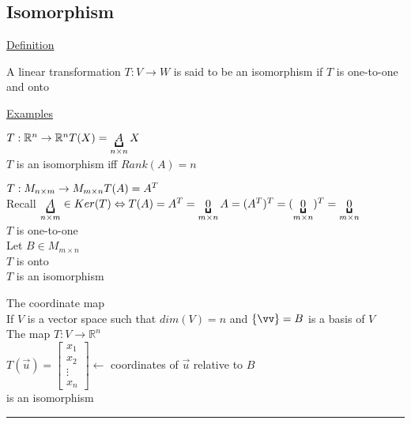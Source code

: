 \documentclass[12pt]{article}
\renewcommand{\v}[1]{\overrightarrow{#1}}
\newcommand\m[1]{\begin{bmatrix}#1\end{bmatrix}}
\newcommand{\real}[0]{\mathbb{R}}
\newenvironment{block}[1][Label]{\underline{#1}\par}{}
\newcommand{\uu}[1]{\underbracket{#1}}
\newenvironment{examples}{\shownto{-,compact}\underline{Examples}\enumerate}{\endenumerate\divider\endshownto}
\newcommand{\bb}[1]{\left\{#1\right\}}
\newcommand{\divider}[0]{\textcolor{lightgray}{\rule{\textwidth}{0.1pt}}}
\begin{document}
\subsection{Isomorphism}

\begin{block}[Definition]
	A linear transformation $T: V \rightarrow W$ is said to be an isomorphism if $T$ is one-to-one and onto
\end{block}

\begin{examples}
	\item $T: \real^n \rightarrow \real^n \\
	T(X) = \uu{A}_{n \times n} X$ \\
	$T$ is an isomorphism iff $Rank(A) = n$
	\item $T: M_{n \times m} \rightarrow M_{m \times n} \\
	T(A) = A^T$ \\
	Recall $\uu{A}_{n \times m} \in Ker(T) \Leftrightarrow T(A) = A^T = \uu{0}_{m \times n} \\
	A = (A^T)^T = (\uu{0}_{m \times n})^T = \uu{0}_{m \times n}$ \\
	$T$ is one-to-one \\
	Let $B \in M_{m \times n}$ \\
	$T$ is onto \\
	
	$T$ is an isomorphism
	
	\item The coordinate map \\
	If $V$ is a vector space such that $dim(V) = n$ and $\bb{\vv} = B$ is a basis of $V$ \\
	The map $T: V \rightarrow \real^n$ \\
	$T(\v{u}) = \m{x_1 \\ x_2 \\ \vdots \\ x_n} \leftarrow$ coordinates of $\v{u}$ relative to $B$ \\
	is an isomorphism
\end{examples}
\end{document}
